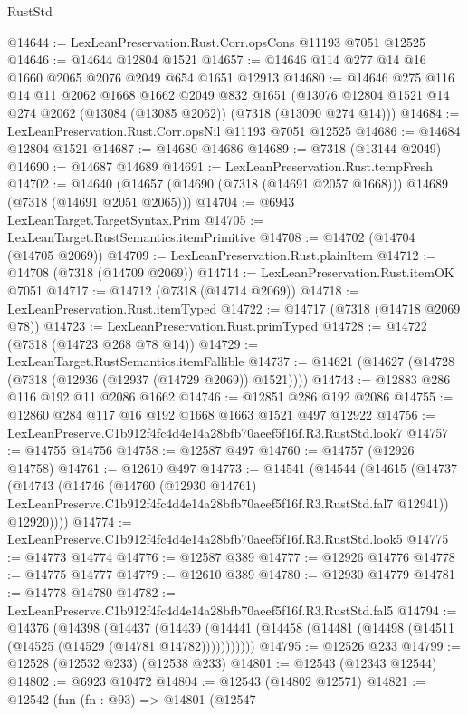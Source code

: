 \begin{lexlean}{RustStd}
\begin{coremodule}
@14644 := LexLeanPreservation.Rust.Corr.opsCons @11193 @7051 @12525
@14646 := @14644 @12804 @1521
@14657 := @14646 @114 @277 @14 @16 @1660 @2065 @2076 @2049 @654 @1651 @12913
@14680 := @14646
    @275
    @116
    @14
    @11
    @2062
    @1668
    @1662
    @2049
    @832
    @1651
    (@13076 @12804 @1521 @14 @274 @2062 (@13084 (@13085 @2062)) (@7318 (@13090 @274 @14)))
@14684 := LexLeanPreservation.Rust.Corr.opsNil @11193 @7051 @12525
@14686 := @14684 @12804 @1521
@14687 := @14680 @14686
@14689 := @7318 (@13144 @2049)
@14690 := @14687 @14689
@14691 := LexLeanPreservation.Rust.tempFresh
@14702 := @14640 (@14657 (@14690 (@7318 (@14691 @2057 @1668))) @14689 (@7318 (@14691 @2051 @2065)))
@14704 := @6943 LexLeanTarget.TargetSyntax.Prim
@14705 := LexLeanTarget.RustSemantics.itemPrimitive
@14708 := @14702 (@14704 (@14705 @2069))
@14709 := LexLeanPreservation.Rust.plainItem
@14712 := @14708 (@7318 (@14709 @2069))
@14714 := LexLeanPreservation.Rust.itemOK @7051
@14717 := @14712 (@7318 (@14714 @2069))
@14718 := LexLeanPreservation.Rust.itemTyped
@14722 := @14717 (@7318 (@14718 @2069 @78))
@14723 := LexLeanPreservation.Rust.primTyped
@14728 := @14722 (@7318 (@14723 @268 @78 @14))
@14729 := LexLeanTarget.RustSemantics.itemFallible
@14737 := @14621 (@14627 (@14728 (@7318 (@12936 (@12937 (@14729 @2069)) @1521))))
@14743 := @12883 @286 @116 @192 @11 @2086 @1662
@14746 := @12851 @286 @192 @2086
@14755 := @12860 @284 @117 @16 @192 @1668 @1663 @1521 @497 @12922
@14756 := LexLeanPreserve.C1b912f4fc4d4e14a28bfb70aeef5f16f.R3.RustStd.look7
@14757 := @14755 @14756
@14758 := @12587 @497
@14760 := @14757 (@12926 @14758)
@14761 := @12610 @497
@14773 := @14541
    (@14544
      (@14615
        (@14737
          (@14743
            (@14746
              (@14760
                (@12930 @14761)
                LexLeanPreserve.C1b912f4fc4d4e14a28bfb70aeef5f16f.R3.RustStd.fal7
                @12941))
            @12920))))
@14774 := LexLeanPreserve.C1b912f4fc4d4e14a28bfb70aeef5f16f.R3.RustStd.look5
@14775 := @14773 @14774
@14776 := @12587 @389
@14777 := @12926 @14776
@14778 := @14775 @14777
@14779 := @12610 @389
@14780 := @12930 @14779
@14781 := @14778 @14780
@14782 := LexLeanPreserve.C1b912f4fc4d4e14a28bfb70aeef5f16f.R3.RustStd.fal5
@14794 := @14376
    (@14398
      (@14437
        (@14439 (@14441 (@14458 (@14481 (@14498 (@14511 (@14525 (@14529 (@14781 @14782)))))))))))
@14795 := @12526 @233
@14799 := @12528 (@12532 @233) (@12538 @233)
@14801 := @12543 (@12343 @12544)
@14802 := @6923 @10472
@14804 := @12543 (@14802 @12571)
@14821 := @12542
    (fun (fn : @93) =>
    @14801
      (@12547

\end{coremodule}
\end{lexlean}
